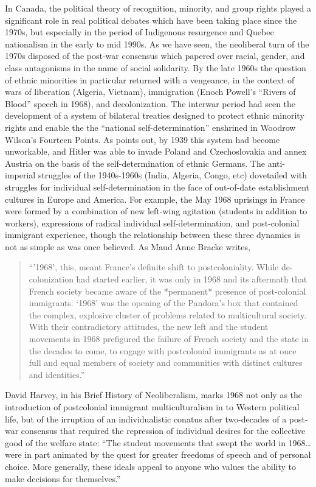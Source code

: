 \documentclass[12pt,oneside]{memoir}
\begin{document}
In Canada, the political theory of recognition, minority, and group rights played a significant role in real political debates which have been taking place since the 1970s, but especially in the period of Indigenous resurgence and Quebec nationalism in the early to mid 1990s. As we have seen, the neoliberal turn of the 1970s disposed of the post-war consensus which papered over racial, gender, and class antagonisms in the name of social solidarity. By the late 1960s the question of ethnic minorities in particular returned with a vengeance, in the context of wars of liberation (Algeria, Vietnam), immigration (Enoch Powell's ``Rivers of Blood'' speech in 1968), and decolonization. The interwar period had seen the development of a system of bilateral treaties designed to protect ethnic minority rights and enable the the ``national self-determination'' enshrined in Woodrow Wilson's Fourteen Points. As \cite[2]{kymlicka-1995} points out, by 1939 this system had become unworkable, and Hitler was able to invade Poland and Czechoslovakia and annex Austria on the basis of the self-determination of ethnic Germans. The anti-imperial struggles of the 1940s-1960s (India, Algeria, Congo, etc) dovetailed with struggles for individual self-determination in the face of out-of-date establishment cultures in Europe and America. For example, the May 1968 uprisings in France were formed by a combination of new left-wing agitation (students in addition to workers), expressions of radical individual self-determination, and post-colonial immigrant experience, though the relationship between these three dynamics is not as simple as was once believed. As Maud Anne Bracke writes,
\begin{quote}
	``'1968', this, meant France's definite shift to postcoloniality. While de-colonization had started earlier, it was only in 1968 and its aftermath that French society became aware of the *permanent* presence of post-colonial immigrants. `1968' was the opening of the Pandora's box that contained the complex, explosive cluster of problems related to multicultural society. With their contradictory attitudes, the new left and the student movements in 1968 prefigured the failure of French society and the state in the decades to come, to engage with postcolonial immigrants as at once full and equal members of society and communities with distinct cultures and identities.'' \citep[128]{bracke-2009}
\end{quote}

David Harvey, in his Brief History of Neoliberalism, marks 1968 not only as the introduction of  postcolonial immigrant multiculturalism in to Western political life, but of the irruption of an individualistic conatus after two-decades of a post-war consensus that required the repression of individual desires for the collective good of the welfare state: ``The student movements that swept the world in 1968{\ldots} were in part animated by the quest for greater freedoms of speech and of personal choice. More generally, these ideals appeal to anyone who values the ability to make decisions for themselves.'' \citep[5]{harvey-2005}
\end{document}
